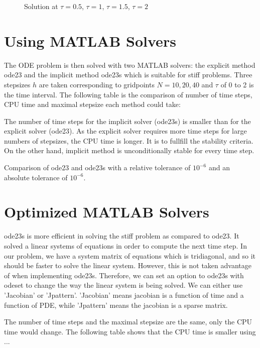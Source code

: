 \documentclass{article}
\begin{document}
\begin{figure}
  \centering
  \caption{Solution at $\tau = 0.5$, $\tau = 1$, $\tau = 1.5$, $\tau = 2$}
    \label{2dplots}
\end{figure}

\section{Using MATLAB Solvers}

The ODE problem is then solved with two MATLAB solvers: the explicit method ode23 and the implicit method ode23s which is suitable for stiff problems. Three stepsizes $h$ are taken corresponding to gridpoints $N = 10, 20, 40$ and $\tau$ of 0 to 2 is the time interval. The following table is the comparison of number of time steps, CPU time and maximal stepsize each method could take:

The number of time steps for the implicit solver (ode23s) is smaller than for the explicit solver (ode23). As the explicit solver requires more time steps for large numbers of stepsizes, the CPU time is longer. It is to fullfill the stability criteria. On the other hand, implicit method is unconditionally stable for every time step. 
\begin{table}[!h]
 \caption{Comparison of ode23 and ode23s with a relative tolerance of $10^{-6}$ and an absolute tolerance of $10^{-6}$.}
\end{table}

\section{Optimized MATLAB Solvers}

ode23s is more efficient in solving the stiff problem as compared to ode23. It solved a linear systems of equations in order to compute the next time step. In our problem, we have a system matrix of equations which is tridiagonal, and so it should be faster to solve the linear system. However, this is not taken advantage of when implementing ode23s. Therefore, we can set an option to ode23s with odeset to change the way the linear system is being solved. We can either use 'Jacobian' or 'Jpattern'. 'Jacobian' means jacobian is a function of time and a function of PDE, while 'Jpattern' means the jacobian is a sparse matrix.

The number of time steps and the maximal stepsize are the same, only the CPU time would change. The following table shows that the CPU time is smaller using ...
\end{document}
